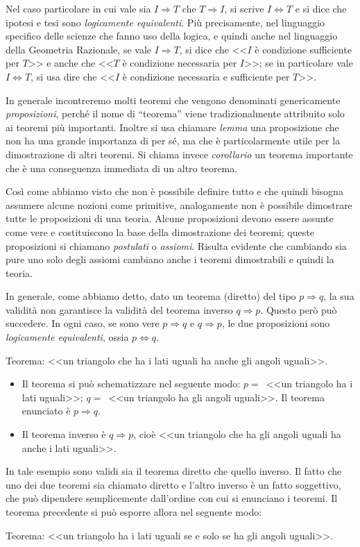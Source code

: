 Nel caso particolare in cui vale sia $I\Rightarrow T$ che 
$T\Rightarrow I$, si scrive  $I\Leftrightarrow T$ e si dice che 
ipotesi e tesi sono \emph{logicamente equivalenti}. Più precisamente, 
nel linguaggio specifico delle scienze che fanno uso della logica, e 
quindi anche nel linguaggio della Geometria Razionale, se vale 
$I\Rightarrow T$, si dice che <<$I$ è condizione sufficiente per 
$T$>> e anche che <<$T$ è condizione necessaria per $I$>>; se in 
particolare vale  $I\Leftrightarrow T$, si usa dire che <<$I$ è 
condizione necessaria e sufficiente per $T$>>.

In generale incontreremo molti teoremi che vengono denominati 
genericamente \emph{proposizioni}, perché il nome di ``teorema'' 
viene tradizionalmente attribuito solo ai teoremi più importanti. 
Inoltre si usa chiamare \emph{lemma} una proposizione che non ha una 
grande importanza di per sé, ma che è particolarmente utile per la 
dimostrazione di altri teoremi. Si chiama invece \emph{corollario} un 
teorema importante che è una conseguenza immediata di un altro 
teorema.

Così come abbiamo visto che non è possibile definire tutto e che 
quindi bisogna assumere alcune nozioni come primitive, analogamente 
non è possibile dimostrare tutte le proposizioni di una teoria. 
Alcune proposizioni devono essere assunte come vere e costituiscono la 
base della dimostrazione dei teoremi; queste proposizioni si chiamano 
\emph{postulati} o \emph{assiomi}. Risulta evidente che cambiando sia 
pure uno solo degli assiomi cambiano anche i teoremi dimostrabili e 
quindi la teoria.

In generale, come abbiamo detto, dato un teorema (diretto) del tipo 
$p\Rightarrow q$, la sua validità non garantisce la validità del 
teorema inverso $q\Rightarrow p$. Questo però può succedere. In ogni 
caso, se sono vere $p\Rightarrow q$ e $q\Rightarrow p$, le due 
proposizioni sono \emph{logicamente equivalenti}, ossia 
$p\Leftrightarrow q$.
\begin{exrig}
	\begin{esempio}
		Teorema: <<un triangolo che ha i lati uguali ha anche gli 
angoli 
		uguali>>.
		\begin{itemize}
			\item Il teorema si può schematizzare nel seguente 
modo: $p=$~<<un 
			triangolo ha i lati uguali>>; $q=$~<<un triangolo ha 
gli angoli 
			uguali>>. Il teorema enunciato è $p\Rightarrow q$.
			\item  Il teorema inverso è  $q\Rightarrow p$, cioè 
<<un triangolo 
			che ha gli angoli uguali ha anche i lati uguali>>.
		\end{itemize}
		In tale esempio sono validi sia il teorema diretto che quello 
		inverso. Il fatto che uno dei due teoremi sia chiamato diretto 
e 
		l'altro inverso è un fatto soggettivo, che può dipendere 
		semplicemente dall'ordine con cui si enunciano i teoremi.
		Il teorema precedente si può esporre allora nel seguente modo:
		\item Teorema: <<un triangolo ha i lati uguali se e solo se ha 
gli 
		angoli uguali>>.
	\end{esempio}
\end{exrig}

